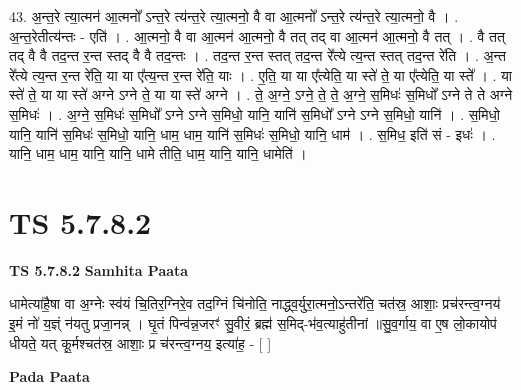 \documentclass[17pt]{extarticle}
\begin{document}
43. अ॒न्त॒रे त्या॒त्मन॑ आ॒त्मनो᳚ ऽन्त॒रे त्य॑न्त॒रे त्या॒त्मनो॒ वै वा आ॒त्मनो᳚ ऽन्त॒रे त्य॑न्त॒रे त्या॒त्मनो॒ वै । . अ॒न्त॒रेतीत्य॑न्तः - एति॑ । . आ॒त्मनो॒ वै वा आ॒त्मन॑ आ॒त्मनो॒ वै तत् तद् वा आ॒त्मन॑ आ॒त्मनो॒ वै तत् । . वै तत् तद् वै वै तद॒न्त र॒न्त स्तद् वै वै तद॒न्तः । . तद॒न्त र॒न्त स्तत् तद॒न्त रे᳚त्ये त्य॒न्त स्तत् तद॒न्त रे॑ति । . अ॒न्त रे᳚त्ये त्य॒न्त र॒न्त रे॑ति॒ या या ए᳚त्य॒न्त र॒न्त रे॑ति॒ याः । . ए॒ति॒ या या ए᳚त्येति॒ या स्ते॑ ते॒ या ए᳚त्येति॒ या स्ते᳚ । . या स्ते॑ ते॒ या या स्ते॑ अग्ने ऽग्ने ते॒ या या स्ते॑ अग्ने । . ते॒ अ॒ग्ने॒ ऽग्ने॒ ते॒ ते॒ अ॒ग्ने॒ स॒मिधः॑ स॒मिधो᳚ ऽग्ने ते ते अग्ने स॒मिधः॑ । . अ॒ग्ने॒ स॒मिधः॑ स॒मिधो᳚ ऽग्ने ऽग्ने स॒मिधो॒ यानि॒ यानि॑ स॒मिधो᳚ ऽग्ने ऽग्ने स॒मिधो॒ यानि॑ । . स॒मिधो॒ यानि॒ यानि॑ स॒मिधः॑ स॒मिधो॒ यानि॒ धाम॒ धाम॒ यानि॑ स॒मिधः॑ स॒मिधो॒ यानि॒ धाम॑ । . स॒मिध॒ इति॑ सं - इधः॑ । . यानि॒ धाम॒ धाम॒ यानि॒ यानि॒ धामे तीति॒ धाम॒ यानि॒ यानि॒ धामेति॑ । \newline
\pagebreak
{}

\section{ TS 5.7.8.2 }

\textbf{TS 5.7.8.2 } \newline
\textbf{Samhita Paata} \newline

धामेत्या॑है॒षा वा अ॒ग्नेः स्व॑यं चि॒तिर॒ग्निरे॒व तद॒ग्निं चि॑नोति॒ नाद्ध्व॒र्युरा॒त्मनो॒ऽन्तरे॑ति॒ चत॑स्र॒ आशाः॒ प्रच॑रन्त्व॒ग्नय॑ इ॒मं नो॑ य॒ज्ञ्ं न॑यतु प्रजा॒नन्न्  । घृ॒तं पिन्व॑न्न॒जरꣳ॑ सु॒वीरं॒ ब्रह्म॑ स॒मिद्-भ॑व॒त्याहु॑तीनां ॥सु॒व॒र्गाय॒ वा ए॒ष लो॒कायोप॑ धीयते॒ यत् कू॒र्मश्चत॑स्र॒ आशाः॒ प्र च॑रन्त्व॒ग्नय॒ इत्या॑ह॒ - [  ] \newline

\textbf{Pada Paata} \newline
\end{document}

